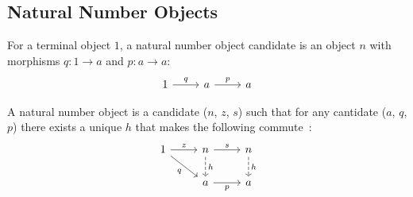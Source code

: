 \subsection{Natural Number Objects}
\begin{definition}
	For a terminal object $1$, a natural number object candidate is an object $n$
	with morphisms $q: 1 \to a$ and $p: a \to a$:
	\[\begin{tikzcd}[ampersand replacement=\&]
		1 \& a \& a
		\arrow["q", from=1-1, to=1-2]
		\arrow["p", from=1-2, to=1-3]
	\end{tikzcd}\]

	A natural number object is a candidate ($n$, $z$, $s$) such that for any
	cantidate ($a$, $q$, $p$) there exists a unique $h$ that makes the following
	commute~\parencite{awodey:category_theory}:
	\[\begin{tikzcd}[ampersand replacement=\&]
		1 \& n \& n \\
		\& a \& a
		\arrow["z", from=1-1, to=1-2]
		\arrow["q"', from=1-1, to=2-2]
		\arrow["s", from=1-2, to=1-3]
		\arrow["p"', from=2-2, to=2-3]
		\arrow["h", dashed, from=1-2, to=2-2]
		\arrow["h", dashed, from=1-3, to=2-3]
	\end{tikzcd}\]
\end{definition}
